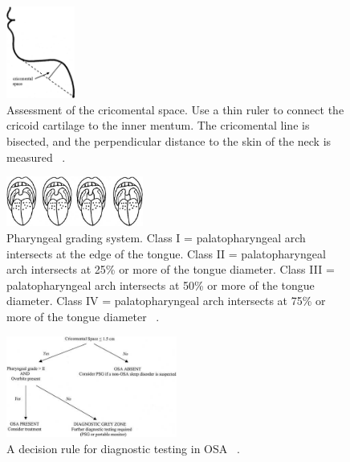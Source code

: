 \begin{figure}[h]
\centering 
\includegraphics[width=0.2\textwidth]{drawings/cricomental}
\caption{Assessment of the cricomental space. Use a thin ruler to connect the cricoid cartilage to the inner mentum. The cricomental line is bisected, and the perpendicular distance to the skin of the neck is measured ~\cite{tsai2003decision}.}
\label{fig:cricomental}
\end{figure}
\begin{figure}[h]
\centering 
\includegraphics[width=0.4\textwidth]{drawings/pharyngeal}
\caption{Pharyngeal grading system. Class I = palatopharyngeal arch intersects at the edge of the tongue. Class II = palatopharyngeal arch intersects at 25\% or more of the tongue diameter. Class III = palatopharyngeal arch intersects at 50\% or more of the tongue diameter. Class IV = palatopharyngeal arch intersects at 75\% or more of the tongue diameter ~\cite{tsai2003decision}.}
\label{fig:pharyngeal}
\end{figure}
\begin{figure}[h]
\centering 
\includegraphics[width=0.5\textwidth]{drawings/flowchart}
\caption{A decision rule for diagnostic testing in OSA ~\cite{tsai2003decision}.}
\label{fig:flowchart}
\end{figure}


